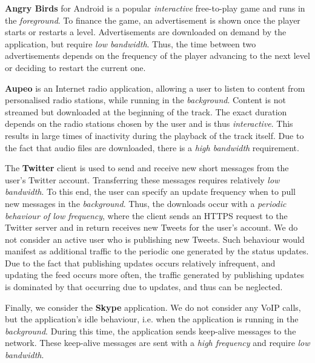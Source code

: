 \textbf{Angry Birds} for Android is a popular \emph{interactive} free-to-play game and runs in the \emph{foreground}.
To finance the game, an advertisement is shown once the player starts or restarts a level.
Advertisements are downloaded on demand by the application, but require \emph{low bandwidth}.
Thus, the time between two advertisements depends on the frequency of the player advancing to the next level or deciding to restart the current one.

\textbf{Aupeo} is an Internet radio application, allowing a user to listen to content from personalised radio stations, while running in the \emph{background}.
Content is not streamed but downloaded at the beginning of the track.
The exact duration depends on the radio stations chosen by the user and is thus \emph{interactive}.
This results in large times of inactivity during the playback of the track itself.
Due to the fact that audio files are downloaded, there is a \emph{high bandwidth} requirement.

The \textbf{Twitter} client is used to send and receive new short messages from the user's Twitter account.
Transferring these messages requires relatively \emph{low bandwidth}.
To this end, the user can specify an update frequency when to pull new messages in the \emph{background}.
Thus, the downloads occur with a \emph{periodic behaviour of low frequency}, where
the client sends an \gls{HTTPS} request to the Twitter server and in return receives new Tweets for the user's account.
We do not consider an active user who is publishing new Tweets.
Such behaviour would manifest as additional traffic to the periodic one generated by the status updates.
Due to the fact that publishing updates occurs relatively infrequent, and updating the feed occurs more often, the traffic generated by publishing updates is dominated by that occurring due to updates, and thus can be neglected.

Finally, we consider the \textbf{Skype} application.
We do not consider any \gls{VoIP} calls, but the application's idle behaviour, i.e. when the application is running in the \emph{background}.
During this time, the application sends keep-alive messages to the network.
These keep-alive messages are sent with a \emph{high frequency} and require \emph{low bandwidth}.

